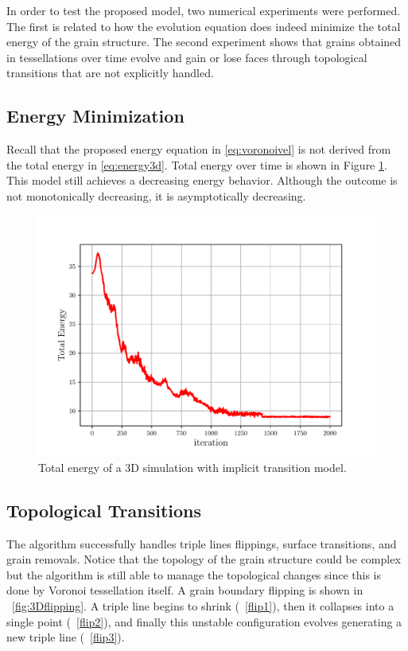 In order to test the proposed model, two numerical experiments were performed. The first is related to how the evolution equation does indeed minimize the total energy of the grain structure. The second experiment shows that grains obtained in tessellations over time evolve and gain or lose faces through topological transitions that are not explicitly handled.

\subsection{Energy Minimization}

Recall that the proposed energy equation in \eqref{eq:voronoivel} is not derived from the total energy in \eqref{eq:energy3d}.
Total energy over time is shown in Figure \ref{fig:3D_energy}. This model still achieves a decreasing energy behavior. 
Although the outcome is not monotonically decreasing, it is asymptotically decreasing.

\begin{figure}
    \centering
    \includegraphics[scale=0.6]{figures/3D_energy.pdf}
    \caption{Total energy of a 3D simulation with implicit transition model.}
    \label{fig:3D_energy}
\end{figure}

\subsection{Topological Transitions}
The algorithm
successfully handles triple lines flippings, surface transitions, and grain removals.
Notice that the topology of the grain structure could be complex but the algorithm is still able to manage the  topological changes since this is done by Voronoi tessellation itself.
A grain boundary flipping is shown in \figurename~\ref{fig:3Dflipping}.
A triple line begins to shrink
(\figurename~\ref{flip1}), 
then it collapses into a single point 
(\figurename~\ref{flip2}), 
and finally this unstable configuration evolves generating a new triple line (\figurename~\ref{flip3}).

